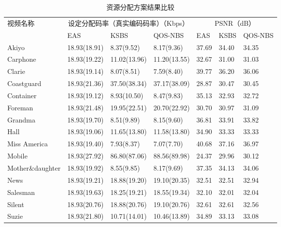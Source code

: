 \begin{table}[htbp]
    \wuhao
    \centering
    \caption{资源分配方案结果比较}
    \begin{tabular*}{\textwidth}{p{3cm}llp{2.5cm}lll}
    \toprule
    视频名称 & \multicolumn{3}{c}{设定分配码率（真实编码码率）（Kbps）} &  \multicolumn{3}{c}{PSNR（dB）} \\
    \cmidrule{2-7}
             &  EAS & KSBS & QOS-NBS&  EAS & KSBS & QOS-NBS \\
    \midrule
Akiyo           	 & 18.93(18.91)& 8.37(9.52)&8.17(9.36)  &37.69  &34.40  &34.35 \\ 
Carphone        	 & 18.93(19.22)& 11.02(13.96)&11.20(13.55)  &32.67  &31.00  &31.03 \\ 
Clarie          	 & 18.93(19.14)& 8.07(8.51)&7.59(8.40)  &39.77  &36.20  &36.06 \\ 
Coastguard      	 & 18.93(21.36)& 37.50(38.34)&37.17(38.09)  &28.87  &30.47  &30.45 \\ 
Container       	 & 18.93(19.12)& 8.93(10.50)&8.47(9.83)  &35.13  &32.93  &32.72 \\ 
Foreman         	 & 18.93(21.48)& 19.95(22.51)&20.70(22.92)  &30.70  &30.97  &31.09 \\ 
Grandma         	 & 18.93(19.70)& 8.51(9.89)&8.15(9.60)  &36.81  &33.91  &33.82 \\ 
Hall            	 & 18.93(19.06)& 11.65(13.80)&11.58(13.80)  &34.90  &33.33  &33.33 \\ 
Miss America    	 & 18.93(19.40)& 7.93(8.37)&7.07(7.70)  &40.68  &37.16  &36.97 \\ 
Mobile          	 & 18.93(27.92)& 86.80(87.06)&88.56(89.98)  &24.37  &29.96  &30.12 \\ 
Mother\&daughter	 & 18.93(19.92)& 8.55(9.85)&8.17(9.69)  &37.35  &34.13  &34.06 \\ 
News            	 & 18.93(19.21)& 18.88(19.20)&19.10(20.35)  &32.51  &32.51  &32.94 \\ 
Salesman        	 & 18.93(19.63)& 18.25(19.21)&18.55(19.34)  &32.10  &32.01  &32.04 \\ 
Silent          	 & 18.93(20.76)& 18.88(20.76)&19.10(20.76)  &32.61  &32.61  &32.56 \\ 
Suzie           	 & 18.93(21.80)& 10.71(14.01)&10.46(13.89)  &34.89  &33.13  &33.08 \\ 
\bottomrule
    \end{tabular*}
    \label{tab:chap_nash:resource_allocation_comparision}
\end{table}

